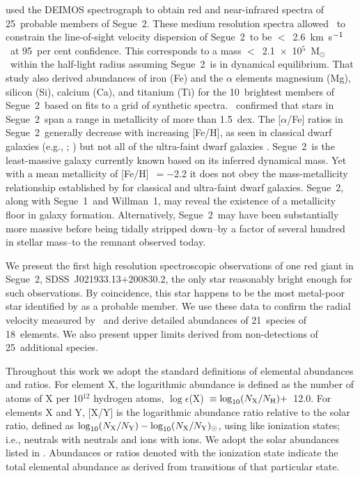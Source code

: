 \documentclass[useAMS,usenatbib,usegraphicx]{mn2e}
\def\kmsec{\mbox{km~s$^{\rm -1}$}}
\def\msun{\mbox{M$_{\odot}$}}
\def\seg{\mbox{SDSS~J021933.13$+$200830.2}}
\def\seggal{\mbox{Segue~2}}
\def\segigal{\mbox{Segue~1}}
\def\wilgal{\mbox{Willman~1}}
\begin{document}
\citet{kirby13} used the DEIMOS spectrograph to obtain
red and near-infrared spectra of 25~probable members of \seggal.
These medium resolution spectra
allowed \citeauthor{kirby13}\ to 
constrain the line-of-sight velocity dispersion of \seggal\ 
to be $<$~2.6~\kmsec\ at 95~per cent confidence.
This corresponds to a mass $<$~2.1~$\times$~10$^{5}$~\msun\
within the half-light radius
assuming \seggal\ is in dynamical equilibrium.
That study also derived abundances of iron (Fe) and 
the $\alpha$ elements
magnesium (Mg), silicon (Si), calcium (Ca), and
titanium (Ti)
for the 10~brightest members of \seggal\
based on fits to a grid of synthetic spectra.
\citeauthor{kirby13}\ confirmed that stars in \seggal\
span a range in metallicity of more than 1.5~dex.
The [$\alpha$/Fe] ratios in \seggal\ generally decrease
with increasing [Fe/H], as seen in 
classical dwarf galaxies
(e.g., \citealt{shetrone03}; \citealt{kirby11a})
but not all of the ultra-faint dwarf galaxies
\citep{frebel10,vargas13}.
\seggal\ is the least-massive galaxy currently known
based on its inferred dynamical mass.
Yet with a mean metallicity of
[Fe/H]~$= -$2.2 it does not obey the mass-metallicity
relationship established by \citet{kirby11b} for 
classical and ultra-faint dwarf galaxies.
\seggal, along with \segigal\ and \wilgal,
may reveal the existence of a metallicity floor in galaxy formation.
Alternatively,
\seggal\ may have been substantially more massive
before being tidally stripped down--by a factor of several
hundred in stellar mass--to the 
remnant observed today.

We present the first high resolution spectroscopic observations of
one red giant in \seggal, \seg, the only star
reasonably bright enough for such observations.
By coincidence, this star happens to be the most metal-poor star 
identified by \citet{kirby13} as a probable member.
We use these data to confirm the radial velocity measured by 
\citeauthor{kirby13}\
and derive detailed abundances of 21~species of 
18~elements.
We also present upper limits derived from non-detections 
of 25~additional species.

Throughout this work we
adopt the standard definitions of elemental abundances and ratios.
For element X, the logarithmic abundance is defined
as the number of atoms of X per 10$^{12}$ hydrogen atoms,
$\log\epsilon$(X)~$\equiv \log_{10}(N_{\rm X}/N_{\rm H}) +$~12.0.
For elements X and Y, [X/Y] is 
the logarithmic abundance ratio relative to the solar ratio,
defined as $\log_{10} (N_{\rm X}/N_{\rm Y}) -
\log_{10} (N_{\rm X}/N_{\rm Y})_{\odot}$, using
like ionization states;
i.e., neutrals with neutrals and ions with ions.
We adopt the solar abundances listed in \citet{asplund09}.
Abundances or ratios denoted with the ionization state
indicate the total elemental abundance as derived from transitions of
that particular state.
\end{document}
